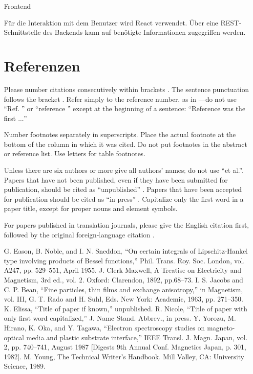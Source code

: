 \documentclass[conference]{IEEEtran}
\begin{document}
Frontend

Für die Interaktion mit dem Benutzer wird React verwendet. Über eine REST-Schnittstelle des Backends kann auf benötigte Informationen zugegriffen werden.

\section*{Referenzen}

Please number citations consecutively within brackets \cite{b1}. The 
sentence punctuation follows the bracket \cite{b2}. Refer simply to the reference 
number, as in \cite{b3}---do not use ``Ref. \cite{b3}'' or ``reference \cite{b3}'' except at 
the beginning of a sentence: ``Reference \cite{b3} was the first $\ldots$''

Number footnotes separately in superscripts. Place the actual footnote at 
the bottom of the column in which it was cited. Do not put footnotes in the 
abstract or reference list. Use letters for table footnotes.

Unless there are six authors or more give all authors' names; do not use 
``et al.''. Papers that have not been published, even if they have been 
submitted for publication, should be cited as ``unpublished'' \cite{b4}. Papers 
that have been accepted for publication should be cited as ``in press'' \cite{b5}. 
Capitalize only the first word in a paper title, except for proper nouns and 
element symbols.

For papers published in translation journals, please give the English 
citation first, followed by the original foreign-language citation \cite{b6}.

\begin{thebibliography}{00}
 G. Eason, B. Noble, and I. N. Sneddon, ``On certain integrals of Lipschitz-Hankel type involving products of Bessel functions,'' Phil. Trans. Roy. Soc. London, vol. A247, pp. 529--551, April 1955.
 J. Clerk Maxwell, A Treatise on Electricity and Magnetism, 3rd ed., vol. 2. Oxford: Clarendon, 1892, pp.68--73.
 I. S. Jacobs and C. P. Bean, ``Fine particles, thin films and exchange anisotropy,'' in Magnetism, vol. III, G. T. Rado and H. Suhl, Eds. New York: Academic, 1963, pp. 271--350.
 K. Elissa, ``Title of paper if known,'' unpublished.
 R. Nicole, ``Title of paper with only first word capitalized,'' J. Name Stand. Abbrev., in press.
 Y. Yorozu, M. Hirano, K. Oka, and Y. Tagawa, ``Electron spectroscopy studies on magneto-optical media and plastic substrate interface,'' IEEE Transl. J. Magn. Japan, vol. 2, pp. 740--741, August 1987 [Digests 9th Annual Conf. Magnetics Japan, p. 301, 1982].
 M. Young, The Technical Writer's Handbook. Mill Valley, CA: University Science, 1989.
\end{thebibliography}
\vspace{12pt}
\end{document}
